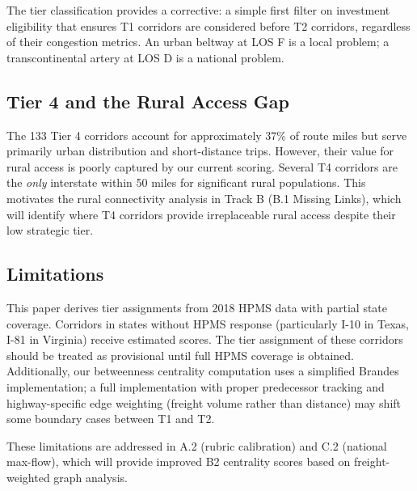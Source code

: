 The tier classification provides a corrective: a simple first filter on investment eligibility that ensures T1 corridors are considered before T2 corridors, regardless of their congestion metrics. An urban beltway at LOS F is a local problem; a transcontinental artery at LOS D is a national problem.

\subsection{Tier 4 and the Rural Access Gap}

The 133 Tier 4 corridors account for approximately 37\% of route miles but serve primarily urban distribution and short-distance trips. However, their value for rural access is poorly captured by our current scoring. Several T4 corridors are the \textit{only} interstate within 50 miles for significant rural populations. This motivates the rural connectivity analysis in Track B (B.1 Missing Links), which will identify where T4 corridors provide irreplaceable rural access despite their low strategic tier.

\subsection{Limitations}

This paper derives tier assignments from 2018 HPMS data with partial state coverage. Corridors in states without HPMS response (particularly I-10 in Texas, I-81 in Virginia) receive estimated scores. The tier assignment of these corridors should be treated as provisional until full HPMS coverage is obtained. Additionally, our betweenness centrality computation uses a simplified Brandes implementation; a full implementation with proper predecessor tracking and highway-specific edge weighting (freight volume rather than distance) may shift some boundary cases between T1 and T2.

These limitations are addressed in A.2 (rubric calibration) and C.2 (national max-flow), which will provide improved B2 centrality scores based on freight-weighted graph analysis.
